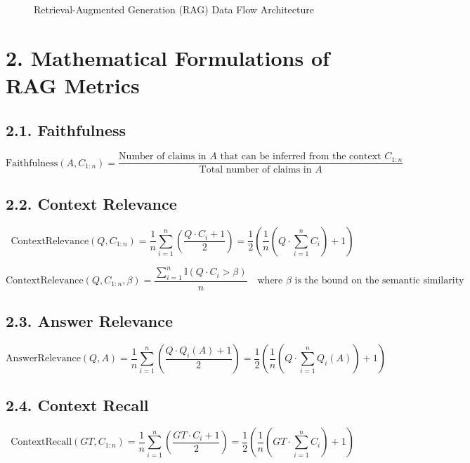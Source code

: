 \documentclass[11pt,a4paper]{article}
\begin{document}
\begin{fleqn}[0pt]
\begin{figure}[htbp]
\caption{Retrieval-Augmented Generation (RAG) Data Flow Architecture}
\end{figure}

\vspace{0.5cm}

\section*{2. Mathematical Formulations of RAG Metrics}

\subsection*{2.1. Faithfulness}
\hspace*{1em}%
\[
\text{Faithfulness}(A, C_{1:n}) = \frac{\text{Number of claims in } A \text{ that can be inferred from the context } C_{1:n}}{\text{Total number of claims in } A}
\]

\subsection*{2.2. Context Relevance}
\hspace*{1em}%
\[
\text{ContextRelevance}(Q, C_{1:n}) = \frac{1}{n} \sum_{i=1}^{n} \left( \frac{Q \cdot C_i + 1}{2} \right) = \frac{1}{2} \left(\frac{1}{n}\left(Q \cdot \sum_{i=1}^{n} C_i\right) + 1 \right)
\]

\[
\text{ContextRelevance}(Q, C_{1:n}, \beta) = \frac{\sum\limits_{i=1}^{n} \mathbb{I}(Q \cdot C_i > \beta)}{n} \quad \text{where } \beta \text{ is the bound on the semantic similarity}
\]

\subsection*{2.3. Answer Relevance}
\hspace*{1em}%
\[
\text{AnswerRelevance}(Q, A) = \frac{1}{n} \sum_{i=1}^{n} \left( \frac{Q \cdot Q_i(A) + 1}{2} \right) = \frac{1}{2} \left(\frac{1}{n}\left(Q \cdot \sum_{i=1}^{n} Q_i(A)\right) + 1 \right)
\]

\subsection*{2.4. Context Recall}
\hspace*{1em}%
\[
\text{ContextRecall}(GT, C_{1:n}) = \frac{1}{n} \sum_{i=1}^{n} \left( \frac{GT \cdot C_i + 1}{2} \right) = \frac{1}{2} \left(\frac{1}{n}\left(GT \cdot \sum_{i=1}^{n} C_i\right) + 1 \right)
\]

\end{fleqn}
\end{document}
